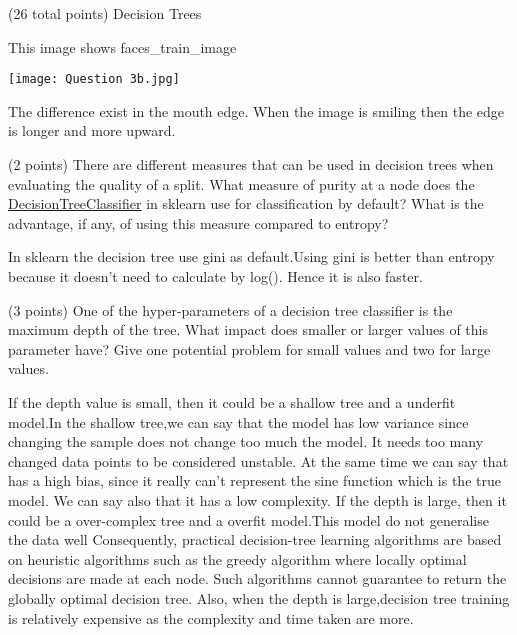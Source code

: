 \documentclass[12pt]{article}
\begin{document}
\begin{question}{(26 total points) Decision Trees}
\begin{subquestion}
\begin{answerbox}{35em}
This image shows faces_train_image
\begin{center}
\texttt{[image: Question 3b.jpg]}
\end{center}
The difference exist in the mouth edge. When the image is smiling then the edge is longer and more upward.





\end{answerbox}



\end{subquestion}


%
%
\begin{subquestion}{(2 points) 
There are different measures that can be used in decision trees when evaluating the quality of a split. 
What measure of purity at a node does the \href{https://scikit-learn.org/0.19/modules/generated/sklearn.tree.DecisionTreeClassifier.html}{DecisionTreeClassifier} in sklearn use for classification by default? 
What is the advantage, if any, of using this measure compared to entropy? 
}


\begin{answerbox}{10em}
In sklearn the decision tree use gini as default.Using gini is better than entropy because it doesn't need to calculate by log(). Hence it is also faster.
\end{answerbox}



\end{subquestion}


%
%
\begin{subquestion}{(3 points) 
One of the hyper-parameters of a decision tree classifier is the maximum depth of the tree. 
What impact does smaller or larger values of this parameter have? Give one potential problem for small values and two for large values. 
}


\begin{answerbox}{10em}
If the depth value is small, then it could be a shallow tree and a underfit model.In the shallow tree,we can say that the model has low variance since changing the sample does not change too much the model. It needs too many changed data points to be considered unstable. At the same time we can say that has a high bias, since it really can't represent the sine function which is the true model. We can say also that it has a low complexity.
If the depth is large, then it could be a over-complex tree and a overfit model.This model do not generalise the data well Consequently, practical decision-tree learning algorithms are based on heuristic algorithms such as the greedy algorithm where locally optimal decisions are made at each node. Such algorithms cannot guarantee to return the globally optimal decision tree. Also, when the depth is large,decision tree training is relatively expensive as the complexity and time taken are more.
\end{answerbox}




\end{subquestion}
\end{question}
\end{document}
